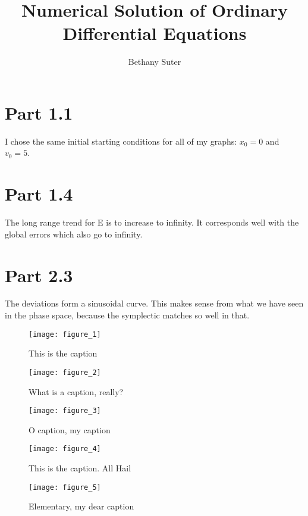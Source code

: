 \documentclass[8pt]{article}
\begin{document}
\title{Numerical Solution of Ordinary Differential Equations}
\author{Bethany Suter}
\maketitle

\section{Part 1.1}
I chose the same initial starting conditions for all of my graphs: $x_0 = 0$ and $v_0 = 5$. 


\section{Part 1.4}
The long range trend for E is to increase to infinity. It corresponds well with the global errors which also go to infinity.

\section{Part 2.3}
The deviations form a sinusoidal curve. This makes sense from what we have seen in the phase space, because the symplectic matches so well in that.

\begin{figure}[H]
\centering
\texttt{[image: figure\_1]}
\caption{This is the caption}
\label{fig:figure_1Label}
\end{figure}

\begin{figure}
\centering
\texttt{[image: figure\_2]}
\caption{What is a caption, really?}
\label{fig:figure_2Label}
\end{figure}

\begin{figure}
\centering
\texttt{[image: figure\_3]}
\caption{O caption, my caption}
\label{fig:figure_3Label}
\end{figure}

\begin{figure}
\centering
\texttt{[image: figure\_4]}
\caption{This is the caption. All Hail}
\label{fig:figure_4Label}
\end{figure}

\begin{figure}
\centering
\texttt{[image: figure\_5]}
\caption{Elementary, my dear caption}
\label{fig:figure_5Label}
\end{figure}
\end{document}
